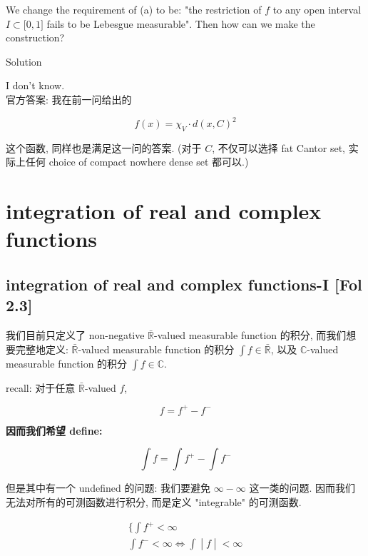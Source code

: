 \documentclass{qlnotes-export}
\begin{document}
We change the requirement of (a) to be: "the restriction of \(f\) to any open interval \(I \subset \lbrack 0,1\rbrack\) fails to be Lebesgue measurable". Then how can we make the construction?

\begin{qlsolution}{Solution}

I don't know.\\
官方答案: 我在前一问给出的

\[f(x) = \chi_{V} \cdot d(x,C)^{2}\]

这个函数, 同样也是满足这一问的答案. (对于 \(C\), 不仅可以选择 fat Cantor set, 实际上任何 choice of compact nowhere dense set 都可以.)

\end{qlsolution}

\chapter{integration of real and complex functions}\label{integration-of-real-and-complex-functions}

\section{integration of real and complex functions-I {[}Fol 2.3{]}}

我们目前只定义了 non-negative \(\bar{\mathbb{R}}\)-valued measurable function 的积分, 而我们想要完整地定义: \(\bar{\mathbb{R}}\)-valued measurable function 的积分 \(\int f \in \bar{\mathbb{R}}\), 以及 \(\mathbb{C}\)-valued measurable function 的积分 \(\int f \in {\mathbb{C}}\).

recall: 对于任意 \(\bar{\mathbb{R}}\)-valued \(f\),

\[f = f^{+} - f^{-}\]

\textbf{因而我们希望 define:}

\[\int f = \int f^{+} - \int f^{-}\]

但是其中有一个 undefined 的问题: 我们要避免 \(\infty - \infty\) 这一类的问题. 因而我们无法对所有的可测函数进行积分, 而是定义 "integrable" 的可测函数.

\begin{lemma}\label{lem-05-integration-of-real-and-complex-functions-lemma-001}

\[\begin{matrix}
{\{\int f^{+} < \infty} \\
\left. \int f^{-} < \infty\Leftrightarrow\int \middle| f \middle| < \infty \right.
\end{matrix}\]

\end{lemma}
\end{document}
